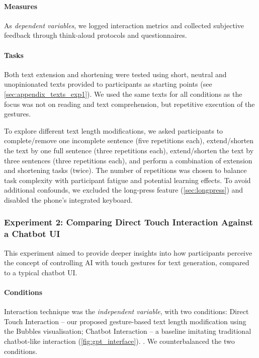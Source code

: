 \paragraph{Measures}
As \textit{dependent variables}, we logged interaction metrics and collected subjective feedback through think-aloud protocols and questionnaires.


\paragraph{Tasks}
Both text extension and shortening were tested using short, neutral and unopinionated texts provided to participants as starting points (see \cref{sec:appendix_texts_exp1}).
We used the same texts for all conditions as the focus was not on reading and text comprehension, but repetitive execution of the gestures.

To explore different text length modifications, we asked participants to complete/remove one incomplete sentence (five repetitions each), extend/shorten the text by one full sentence (three repetitions each), extend/shorten the text by three sentences (three repetitions each), and perform a combination of extension and shortening tasks (twice).
The number of repetitions was chosen to balance task complexity with participant fatigue and potential learning effects.
To avoid additional confounds, we excluded the long-press feature (\cref{sec:longpress}) and disabled the phone's integrated keyboard.



\subsubsection{Experiment 2: Comparing Direct Touch Interaction Against a Chatbot UI}
This experiment aimed to provide deeper insights into how participants perceive the concept of controlling AI with touch gestures for text generation, compared to a typical chatbot UI. %

\paragraph{Conditions}
Interaction technique was the \textit{independent variable}, with two conditions: 
Direct Touch Interaction -- our proposed gesture-based text length modification using the Bubbles visualisation;
Chatbot Interaction -- a baseline imitating traditional chatbot-like interaction (\cref{fig:gpt_interface}).
. 
We counterbalanced the two conditions.


